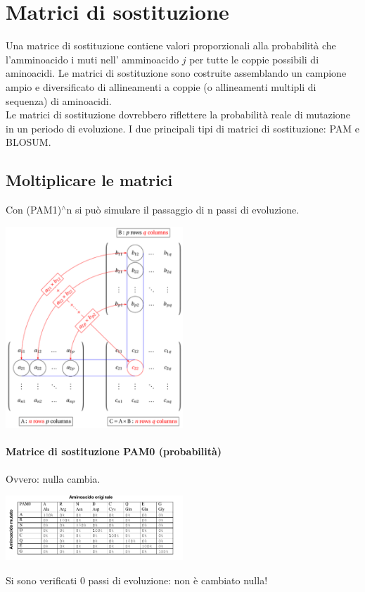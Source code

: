\documentclass{article}
\begin{document}
\section{Matrici di sostituzione}
Una matrice di sostituzione contiene valori proporzionali
alla probabilità che l'amminoacido i muti nell' amminoacido $j$
per tutte le coppie possibili di aminoacidi. Le matrici di sostituzione sono costruite assemblando
un campione ampio e diversificato di allineamenti a coppie
(o allineamenti multipli di sequenza) di aminoacidi.\\
Le matrici di sostituzione dovrebbero riflettere la probabilità
reale di mutazione in un periodo di evoluzione.
I due principali tipi di matrici di sostituzione: PAM e BLOSUM.
\subsection{Moltiplicare le matrici}
Con (PAM1)$^\wedge$n si può simulare il passaggio di n passi di
evoluzione.
\begin{center}
    \includegraphics[width=0.5\textwidth]{figures/pamn.png}\\
\end{center}
\paragraph{Matrice di sostituzione PAM0 (probabilità)} Ovvero: nulla cambia.
\begin{center}
    \includegraphics[width=0.5\textwidth]{figures/pam0.png}\\
\end{center}
Si sono verificati 0 passi di evoluzione: non è cambiato nulla!
\end{document}
